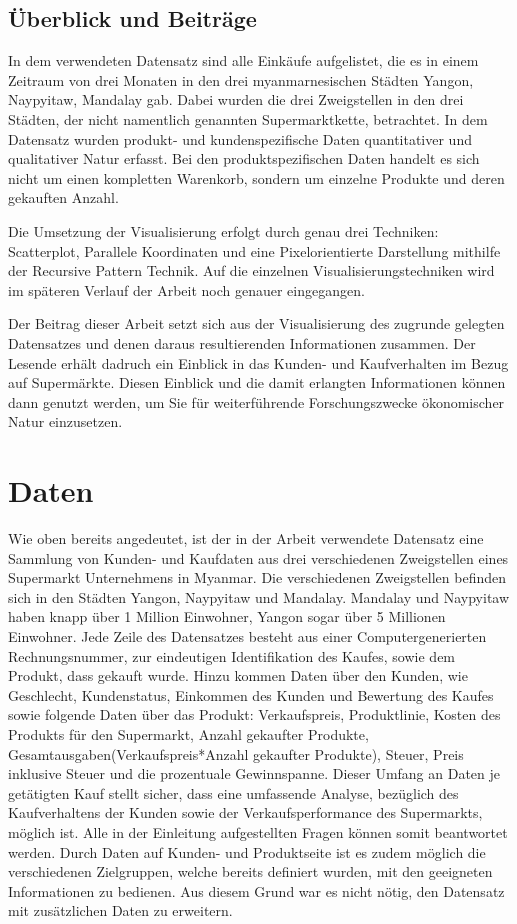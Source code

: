 \documentclass[usegeometry=true]{scrartcl}
\begin{document}
\subsection{Überblick und Beiträge}
In dem verwendeten Datensatz sind alle Einkäufe aufgelistet, die es in einem Zeitraum von drei Monaten in den drei myanmarnesischen Städten Yangon, Naypyitaw, Mandalay gab.
Dabei wurden die drei Zweigstellen in den drei Städten, der nicht namentlich genannten Supermarktkette, betrachtet. In dem Datensatz wurden produkt- und kundenspezifische
Daten quantitativer und qualitativer Natur erfasst. Bei den produktspezifischen Daten handelt es sich nicht um einen kompletten Warenkorb, sondern
um einzelne Produkte und deren gekauften Anzahl.

\noindent Die Umsetzung der Visualisierung erfolgt durch genau drei Techniken: Scatterplot, Parallele Koordinaten und eine Pixelorientierte Darstellung mithilfe der Recursive Pattern
Technik. Auf die einzelnen Visualisierungstechniken wird im späteren Verlauf der Arbeit noch genauer eingegangen.

\noindent Der Beitrag dieser Arbeit setzt sich aus der Visualisierung des zugrunde gelegten Datensatzes und denen daraus resultierenden Informationen zusammen. Der Lesende erhält
dadruch ein Einblick in das Kunden- und Kaufverhalten im Bezug auf Supermärkte. Diesen Einblick und die damit erlangten Informationen können dann genutzt werden, um Sie für
weiterführende Forschungszwecke ökonomischer Natur einzusetzen.

\section{Daten}
Wie oben bereits angedeutet, ist der in der Arbeit verwendete Datensatz eine Sammlung von Kunden- und Kaufdaten aus drei verschiedenen Zweigstellen eines Supermarkt
Unternehmens in Myanmar. Die verschiedenen Zweigstellen befinden sich in den Städten Yangon, Naypyitaw und Mandalay. Mandalay und Naypyitaw haben knapp über 1 Million Einwohner,
Yangon sogar über 5 Millionen Einwohner. Jede Zeile des Datensatzes besteht aus einer Computergenerierten Rechnungsnummer, zur eindeutigen Identifikation des Kaufes, sowie dem
Produkt, dass gekauft wurde. Hinzu kommen Daten über den Kunden, wie Geschlecht, Kundenstatus, Einkommen des Kunden und Bewertung des Kaufes sowie folgende Daten über das Produkt:
Verkaufspreis, Produktlinie, Kosten des Produkts für den Supermarkt, Anzahl gekaufter Produkte, Gesamtausgaben(Verkaufspreis*Anzahl gekaufter Produkte), Steuer,
Preis inklusive Steuer und die prozentuale Gewinnspanne.
Dieser Umfang an Daten je getätigten Kauf stellt sicher, dass eine umfassende Analyse, bezüglich des Kaufverhaltens der Kunden sowie der Verkaufsperformance des Supermarkts,
möglich ist. Alle in der Einleitung aufgestellten Fragen können somit beantwortet werden. Durch Daten auf Kunden- und Produktseite ist es zudem möglich die verschiedenen
Zielgruppen, welche bereits definiert wurden, mit den geeigneten Informationen zu bedienen. Aus diesem Grund war es nicht nötig, den Datensatz mit zusätzlichen Daten zu erweitern.
\end{document}
